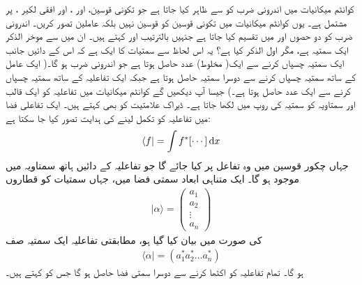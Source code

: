 کوانٹم  میکانیات میں اندرونی ضرب کو  سے ظاہر کیا جاتا ہے جو   تکونی  قوسین،  اور ، اور افقی لکیر ،    پر مشتمل  ہے۔ یوں  کوانٹم میکانیات میں  تکونی  قوسین  کو قوسین نہیں بلکہ عاملین تصور کریں۔ اندرونی ضرب     کو  دو حصوں    اور  میں تقسیم کیا جاتا ہے جنہیں بالترتیب  اور  کہتے ہیں۔  ان میں سے موخر الذکر ایک سمتیہ ہے، مگر اول الذکر کیا ہے؟ یہ اس لحاظ سے سمتیات کا ایک  ہے کہ اس کے دائیں جانب ایک سمتیہ  چسپاں کرنے  سے ایک( مخلوط) عدد حاصل ہوتا ہے جو اندرونی ضرب ہو گا۔( ایک عامل کے ساتھ سمتیہ چسپاں  کرنے  سے دوسرا سمتیہ حاصل ہوتا ہے جبکہ ایک  تفاعلیہ کے ساتھ سمتیہ  چسپاں   کرنے سے ایک عدد حاصل ہوتا ہے۔) جیسا آپ دیکھیں گے کوانٹم  میکانیات میں  تفاعلیہ کو ایک قالب اور سمتاویہ کو سمتیہ کی روپ میں لکھا جاتا ہے۔ ڈیراک علامتیت کو  بھی کہتے ہیں۔ ایک تفاعلی فضا میں تفاعلیہ  کو تکمل لینے کی ہدایت تصور کیا جا سکتا ہے:
\begin{align*}
\langle f | = \int f^{*} [ \cdots ] \dif x
\end{align*}
جہاں چکور قوسین  میں وہ تفاعل پر کیا جائے گا جو تفاعلیہ کے دائیں ہاتھ سمتاویہ میں موجود ہو گا۔ ایک متناہی ابعاد سمتی فضا میں، جہاں سمتیات کو قطاروں 
\begin{align}
| \alpha \rangle = \begin{pmatrix}
a_{1} \\ a_{2} \\ \vdots \\ a_{n} 
\end{pmatrix}
\end{align}
کی صورت میں بیان کیا گیا ہو، مطابقتی تفاعلیہ ایک سمتیہ صف 
\begin{align}
\langle \alpha | = ( a_{1}^{*}a_{2}^{*} \dotsc a_{n}^{*})
\end{align}
ہو گا۔ تمام تفاعلیہ کو اکٹھا کرنے سے دوسرا سمتی فضا حاصل ہو گا جس کو کہتے ہیں۔ 

